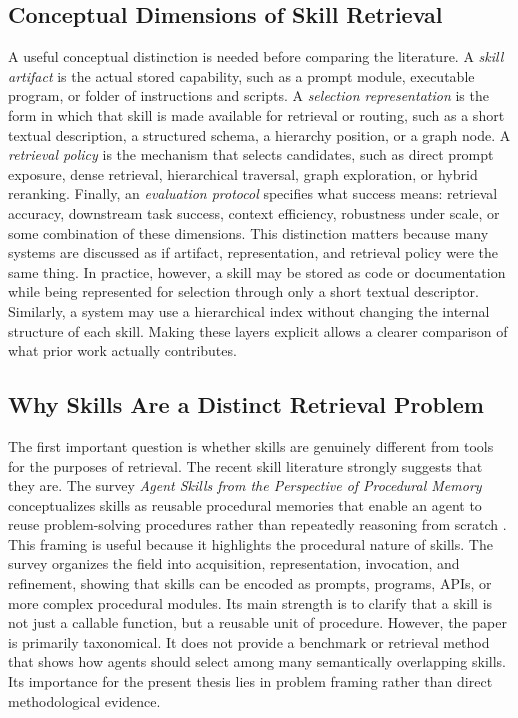 \documentclass[a4paper]{article}
\begin{document}
\subsection{Conceptual Dimensions of Skill Retrieval}
A useful conceptual distinction is needed before comparing the literature. A \emph{skill artifact} is the actual stored capability, such as a prompt module, executable program, or folder of instructions and scripts. A \emph{selection representation} is the form in which that skill is made available for retrieval or routing, such as a short textual description, a structured schema, a hierarchy position, or a graph node. A \emph{retrieval policy} is the mechanism that selects candidates, such as direct prompt exposure, dense retrieval, hierarchical traversal, graph exploration, or hybrid reranking. Finally, an \emph{evaluation protocol} specifies what success means: retrieval accuracy, downstream task success, context efficiency, robustness under scale, or some combination of these dimensions. This distinction matters because many systems are discussed as if artifact, representation, and retrieval policy were the same thing. In practice, however, a skill may be stored as code or documentation while being represented for selection through only a short textual descriptor. Similarly, a system may use a hierarchical index without changing the internal structure of each skill. Making these layers explicit allows a clearer comparison of what prior work actually contributes.

\subsection{Why Skills Are a Distinct Retrieval Problem}
The first important question is whether skills are genuinely different from tools for the purposes of retrieval. The recent skill literature strongly suggests that they are. The survey \emph{Agent Skills from the Perspective of Procedural Memory} conceptualizes skills as reusable procedural memories that enable an agent to reuse problem-solving procedures rather than repeatedly reasoning from scratch \cite{jiang2026procedural}. This framing is useful because it highlights the procedural nature of skills. The survey organizes the field into acquisition, representation, invocation, and refinement, showing that skills can be encoded as prompts, programs, APIs, or more complex procedural modules. Its main strength is to clarify that a skill is not just a callable function, but a reusable unit of procedure. However, the paper is primarily taxonomical. It does not provide a benchmark or retrieval method that shows how agents should select among many semantically overlapping skills. Its importance for the present thesis lies in problem framing rather than direct methodological evidence.
\end{document}
